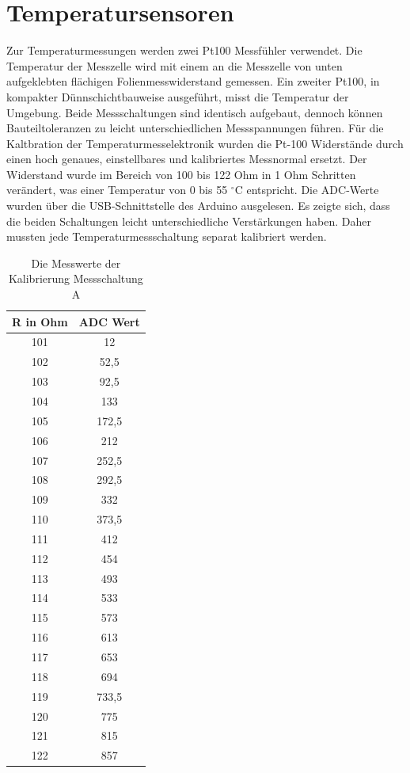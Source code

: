 \documentclass[a4paper,bibtotoc,oneside]{scrbook}
\begin{document}
\section{Temperatursensoren}\thispagestyle{empty}
Zur Temperaturmessungen werden zwei Pt100 Messfühler verwendet. Die Temperatur der Messzelle wird mit einem an die Messzelle von unten aufgeklebten flächigen Folienmesswiderstand gemessen. 
Ein zweiter Pt100, in kompakter Dünnschichtbauweise ausgeführt, misst die Temperatur der Umgebung. Beide Messschaltungen sind identisch aufgebaut, dennoch können Bauteiltoleranzen zu leicht unterschiedlichen Messspannungen führen.
Für die Kaltbration der Temperaturmesselektronik wurden die Pt-100 Widerstände durch einen hoch genaues, einstellbares und kalibriertes Messnormal ersetzt. Der Widerstand wurde im Bereich von 100 bis 122 Ohm in 1 Ohm Schritten verändert, was einer Temperatur von 0 bis 55 $^{\circ}$C entspricht. Die ADC-Werte wurden über die USB-Schnittstelle des Arduino ausgelesen. Es zeigte sich, dass die beiden Schaltungen leicht unterschiedliche Verstärkungen haben. Daher mussten jede Temperaturmessschaltung separat kalibriert werden.  

\begin{table}[htbp]
\centering
\begin{tabular}{ | c | c | }\hline
{\bf R in Ohm} & {\bf ADC Wert}\\ \hline
\hline
101 & 12\\ \hline
102 & 52,5\\ \hline
103 & 92,5\\ \hline
104 & 133\\ \hline
105 & 172,5\\ \hline
106 & 212\\ \hline
107 & 252,5\\ \hline
108 & 292,5\\ \hline
109 & 332\\ \hline
110 & 373,5\\ \hline
111 & 412\\ \hline
112 & 454\\ \hline
113 & 493\\ \hline
114 & 533\\ \hline
115 & 573\\ \hline
116 & 613\\ \hline
117 & 653\\ \hline
118 & 694\\ \hline
119 & 733,5\\ \hline
120 & 775\\ \hline
121 & 815\\ \hline
122 & 857\\ \hline
\end{tabular}
\caption{Die Messwerte der Kalibrierung Messschaltung A}\label{TabA}
\end{table}
\end{document}
